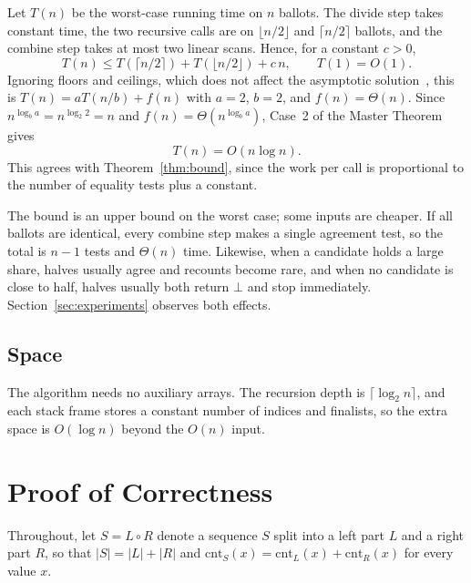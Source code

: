 \documentclass[conference]{IEEEtran}
\newcommand{\cnt}{\mathrm{cnt}}
\begin{document}
Let $T(n)$ be the worst-case running time on $n$ ballots. The divide step
takes constant time, the two recursive calls are on
$\lfloor n/2 \rfloor$ and $\lceil n/2 \rceil$ ballots, and the combine step
takes at most two linear scans. Hence, for a constant $c > 0$,
\begin{equation}
T(n) \le T(\lceil n/2 \rceil) + T(\lfloor n/2 \rfloor) + c\,n,
\qquad T(1) = O(1).
\label{eq:recurrence}
\end{equation}
Ignoring floors and ceilings, which does not affect the asymptotic
solution~\cite{cormen2009introduction}, this is $T(n) = aT(n/b) + f(n)$ with
$a = 2$, $b = 2$, and $f(n) = \Theta(n)$. Since
$n^{\log_b a} = n^{\log_2 2} = n$ and $f(n) = \Theta(n^{\log_b a})$, Case~2
of the Master Theorem~\cite{bentley1980general,cormen2009introduction} gives
\begin{equation}
T(n) = O(n \log n).
\label{eq:nlogn}
\end{equation}
This agrees with Theorem~\ref{thm:bound}, since the work per call is
proportional to the number of equality tests plus a constant.

The bound is an upper bound on the worst case; some inputs are cheaper. If all
ballots are identical, every combine step makes a single agreement test, so
the total is $n - 1$ tests and $\Theta(n)$ time. Likewise, when a candidate
holds a large share, halves usually agree and recounts become rare, and when
no candidate is close to half, halves usually both return $\bot$ and stop
immediately. Section~\ref{sec:experiments} observes both effects.

\subsection{Space}

The algorithm needs no auxiliary arrays. The recursion depth is
$\lceil\log_2 n\rceil$, and each stack frame stores a constant number of
indices and finalists, so the extra space is $O(\log n)$ beyond the $O(n)$
input.

\section{Proof of Correctness}\label{sec:proof}

Throughout, let $S = L \circ R$ denote a sequence $S$ split into a left part
$L$ and a right part $R$, so that $|S| = |L| + |R|$ and
$\cnt_S(x) = \cnt_L(x) + \cnt_R(x)$ for every value $x$.
\end{document}
